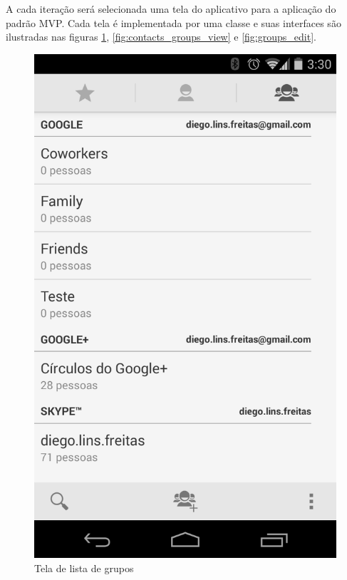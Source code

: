 A cada iteração será selecionada uma tela do aplicativo para a aplicação do
padrão MVP. Cada tela é implementada por uma classe e suas interfaces
são ilustradas nas figuras \ref{fig:contacts_groups},
\ref{fig:contacts_groups_view} e \ref{fig:groups_edit}. 

\begin{figure}[!ht]
	\centering
	\begin{minipage}[b]{0.45\linewidth}
		\label{fig:contacts_groups}
		\caption{Tela de lista de grupos} 
		\begin{center}
			\includegraphics[scale=0.18]{img/contacts_groups.png}

\end{center}
\end{minipage}
\end{figure}
